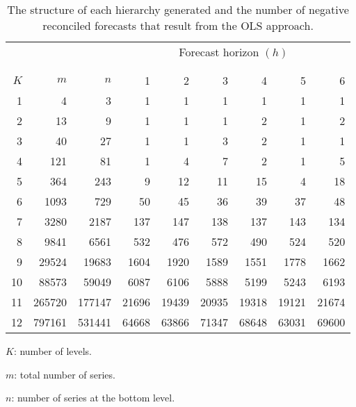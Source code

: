 \documentclass[11pt]{article}
\newcommand{\0}{\phantom{0}}
\begin{document}
\begin{table}[ht]
	\caption{The structure of each hierarchy generated and the number of negative reconciled forecasts that result from the OLS approach.}
	\label{tbl:negstrols}
	\centering
	\begin{threeparttable}
		\begin{tabular}{rrrrrrrrr}
			\toprule
			& & & \multicolumn{6}{c}{Forecast horizon $(h)$}\\[-0.3cm]\\\cline{4-9}\\[-0.3cm]
			$K$ & $m$ & $n$ & 1 & 2 & 3 & 4 & 5 & 6\\
			\midrule
			1 & 4 & 3 & 1 & 1 & 1 & 1 & 1 & 1 \\
			2 & 13 & 9 & 1 & 1 & 1 & 2 & 1 & 2\\
			3 & 40 & 27 & 1 & 1 & 3 & 2 & 1 & 1\\
			4 & 121 & 81 & 1 & 4 & 7 & 2 & 1 & 5 \\
			5 & 364 & 243 & 9 & 12 & 11 & 15 & 4 & 18 \\
			6 & 1093 & 729 & 50 & 45 & 36 & 39 & 37 & 48 \\
			7 & 3280 & 2187 & 137 & 147 & 138 & 137 & 143 & 134 \\
			8 & 9841 & 6561 & 532 & 476 & 572 & 490 & 524 & 520 \\
			9 & 29524 & 19683 & 1604 & 1920 & 1589 & 1551 & 1778 & 1662 \\
			10 & 88573 & 59049 & 6087 & 6106 & 5888 & 5199 & 5243 & 6193 \\
			11 & 265720 & 177147 & 21696 & 19439 & 20935 & 19318 & 19121 & 21674 \\
			12 & 797161 & 531441 & 64668 & 63866 & 71347 & 68648 & 63031 & 69600 \\
			\bottomrule
		\end{tabular}
		\begin{tablenotes}
			\item [] $K$: number of levels.
			\item [] $m$: total number of series.
			\item [] $n$: number of series at the bottom level.
		\end{tablenotes}
	\end{threeparttable}
\end{table}
\end{document}

